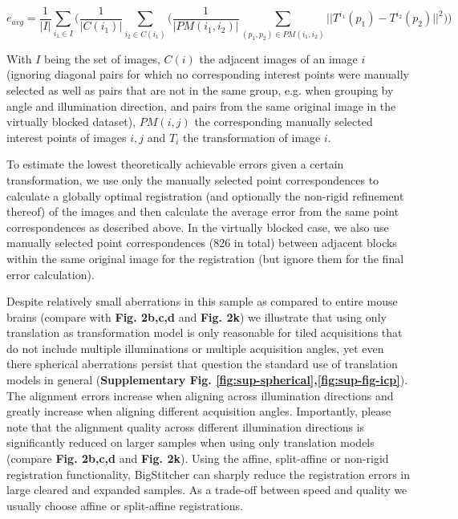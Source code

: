 \begin{equation}
\label{eq:regQuality}
e_{avg} = \frac{1}{|I|} \sum_{i_1 \in I} \bigg( \frac{1}{|C(i_1)|} \sum_{i_2 \in C(i_1)} \Big( \frac{1}{|PM(i_1, i_2)|} \sum_{(p_1, p_2) \in PM(i_1, i_2)} || T^{i_1}(p_1) - T^{i_2}(p_2) ||^2 \Big) \bigg)    
\end{equation}

With $I$ being the set of images, $C(i)$ the adjacent images of an image $i$ (ignoring diagonal pairs for which no corresponding interest points were manually selected as well as pairs that are not in the same group, e.g. when grouping by angle and illumination direction, and pairs from the same original image in the virtually blocked dataset), $PM(i,j)$ the corresponding manually selected interest points of images $i,j$ and $T_i$ the transformation of image $i$.

To estimate the lowest theoretically achievable errors given a certain transformation, we use only the manually selected point correspondences to calculate a globally optimal registration (and optionally the non-rigid refinement thereof) of the images and then calculate the average error from the same point correspondences as described above. In the virtually blocked case, we also use manually selected point correspondences (826 in total) between adjacent blocks within the same original image for the registration (but ignore them for the final error calculation). 

Despite relatively small aberrations in this sample as compared to entire mouse brains (compare with \textbf{Fig. 2b,c,d} and \textbf{Fig. 2k}) we illustrate that using only translation as transformation model is only reasonable for tiled acquisitions that do not include multiple illuminations or multiple acquisition angles, yet even there spherical aberrations persist that question the standard use of translation models in general (\textbf{Supplementary Fig. \ref{fig:sup-spherical},\ref{fig:sup-fig-icp}}). The alignment errors increase when aligning across illumination directions and greatly increase when aligning different acquisition angles. Importantly, please note that the alignment quality across different illumination directions is significantly reduced on larger samples when using only translation models (compare \textbf{Fig. 2b,c,d} and \textbf{Fig. 2k}). Using the affine, split-affine or non-rigid registration functionality, BigStitcher can sharply reduce the registration errors in large cleared and expanded samples. As a trade-off between speed and quality we usually choose affine or split-affine registrations.


